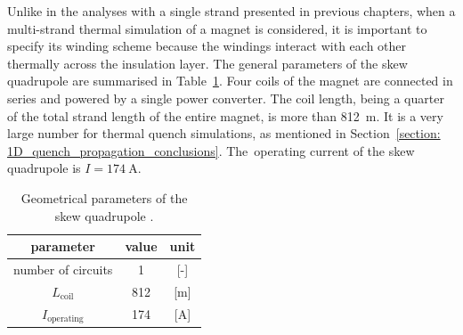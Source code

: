 Unlike in the analyses with a single strand presented in previous chapters, when a multi-strand thermal simulation of a magnet is considered, it is important to specify its winding scheme because the windings interact with each other thermally across the insulation layer. The general parameters of the skew quadrupole are summarised in Table~\ref{table:skew_quad_params_table}. Four coils of the magnet are connected in series and powered by a single power converter. The coil length, being a quarter of the total strand length of the entire magnet, is more than 812~m. It is a very large number for thermal quench simulations, as mentioned in Section~\ref{section: 1D_quench_propagation_conclusions}. The~operating current of the skew quadrupole is $I=174~\text{A}$.

\begin{table}[H]
    \caption{Geometrical parameters of the skew quadrupole \cite{hl_lhc_tech_design_report_v01, marco_prioli_mails}.}
    \vspace{-1.em} 
    \fontsize{10}{10}
    \selectfont 
    \renewcommand{\arraystretch}{1.5}
    \begin{center}
    \begin{tabular}{ ccc }  
    \hline
    parameter & value & unit \\
    \hline
    number of circuits & 1 & [-] \\
    $L_\text{coil}$ & 812 & [m] \\
    $I_\text{operating}$ & 174 & [A] \\
    \hline 
    \end{tabular}
    \end{center}  
     \label{table:skew_quad_params_table} 
 \end{table}